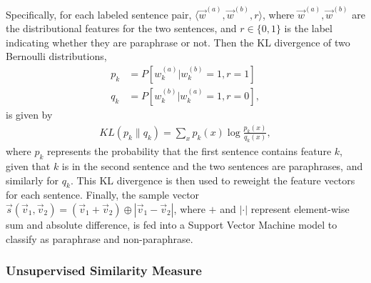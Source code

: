 \documentclass[runningheads]{llncs}
\begin{document}
\begin{itemize}
	Specifically, for each labeled sentence pair, $\langle \vec{w}^{(a)}, \vec{w}^{(b)}, r\rangle$, where $\vec{w}^{(a)}, \vec{w}^{(b)}$ are the distributional features for the two sentences, and $r\in \{0, 1\}$ is the label indicating whether they are paraphrase or not. Then the KL divergence of two Bernoulli distributions,
	\begin{align*}
	p_k & = P[w_{k}^{(a)}|w_{k}^{(b)} = 1, r = 1]\\
	q_k & = P[w_{k}^{(b)}|w_{k}^{(a)} = 1, r = 0],
	\end{align*}
	is given by
	\begin{align*}
	KL(p_k\|q_k) = \displaystyle \sum_xp_k(x)\log \frac{p_k(x)}{q_k(x)},
	\end{align*}
	where $p_k$ represents the probability that the first sentence contains feature $k$, given that $k$ is in the second sentence and the two sentences are paraphrases, and similarly for $q_k$. This KL divergence is then used to reweight the feature vectors for each sentence. Finally, the sample vector $\vec{s}(\vec{v}_1, \vec{v}_2) = (\vec{v}_1 + \vec{v}_2)\oplus |\vec{v}_1 - \vec{v}_2|$, where $+$ and $|\cdot|$ represent element-wise sum and absolute difference, is fed into a Support Vector Machine model to classify as paraphrase and non-paraphrase.
\end{itemize}



\subsubsection{Unsupervised Similarity Measure}
\end{document}
